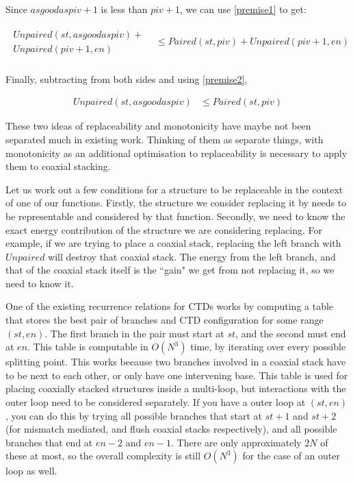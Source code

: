 \documentclass{cshonours}
\begin{document}
Since $asgoodaspiv + 1$ is less than $piv + 1$, we can use \autoref{premise1} to get:

\begin{align*}
\begin{array}{l}
Unpaired(st, asgoodaspiv) + \\
Unpaired(piv + 1, en)
\end{array} &\leq Paired(st, piv) + Unpaired(piv + 1, en) \\
\end{align*}

Finally, subtracting from both sides and using \autoref{premise2},

\begin{align*}
Unpaired(st, asgoodaspiv) &\leq Paired(st, piv)
\end{align*}

These two ideas of replaceability and monotonicity have maybe not been separated much in existing work. Thinking of them as separate things, with monotonicity as an additional optimisation to replaceability is necessary to apply them to coaxial stacking.

Let us work out a few conditions for a structure to be replaceable in the context of one of our functions. Firstly, the structure we consider replacing it by needs to be representable and considered by that function. Secondly, we need to know the exact energy contribution of the structure we are considering replacing. For example, if we are trying to place a coaxial stack, replacing the left branch with $Unpaired$ will destroy that coaxial stack. The energy from the left branch, and that of the coaxial stack itself is the ``gain" we get from not replacing it, so we need to know it.

One of the existing recurrence relations for CTDs works by computing a table that stores the best pair of branches and CTD configuration for some range $(st, en)$. The first branch in the pair must start at $st$, and the second must end at $en$. This table is computable in $O(N^3)$ time, by iterating over every possible splitting point. This works because two branches involved in a coaxial stack have to be next to each other, or only have one intervening base. This table is used for placing coaxially stacked structures inside a multi-loop, but interactions with the outer loop need to be considered separately. If you have a outer loop at $(st, en)$, you can do this by trying all possible branches that start at $st + 1$ and $st + 2$ (for mismatch mediated, and flush coaxial stacks respectively), and all possible branches that end at $en - 2$ and $en - 1$. There are only approximately $2N$ of these at most, so the overall complexity is still $O(N^3)$ for the case of an outer loop as well. 
\end{document}
